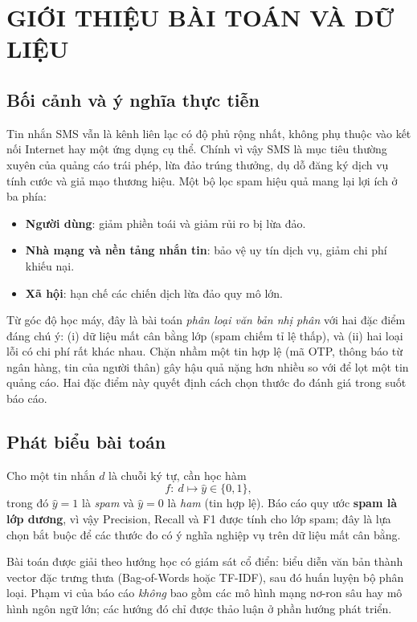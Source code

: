 \chapter{GIỚI THIỆU BÀI TOÁN VÀ DỮ LIỆU}

\section{Bối cảnh và ý nghĩa thực tiễn}

Tin nhắn SMS vẫn là kênh liên lạc có độ phủ rộng nhất, không phụ thuộc vào kết nối Internet hay một ứng dụng cụ thể. Chính vì vậy SMS là mục tiêu thường xuyên của quảng cáo trái phép, lừa đảo trúng thưởng, dụ dỗ đăng ký dịch vụ tính cước và giả mạo thương hiệu. Một bộ lọc spam hiệu quả mang lại lợi ích ở ba phía:

\begin{itemize}
    \item \textbf{Người dùng}: giảm phiền toái và giảm rủi ro bị lừa đảo.
    \item \textbf{Nhà mạng và nền tảng nhắn tin}: bảo vệ uy tín dịch vụ, giảm chi phí khiếu nại.
    \item \textbf{Xã hội}: hạn chế các chiến dịch lừa đảo quy mô lớn.
\end{itemize}

Từ góc độ học máy, đây là bài toán \textit{phân loại văn bản nhị phân} với hai đặc điểm đáng chú ý: (i) dữ liệu mất cân bằng lớp (spam chiếm tỉ lệ thấp), và (ii) hai loại lỗi có chi phí rất khác nhau. Chặn nhầm một tin hợp lệ (mã OTP, thông báo từ ngân hàng, tin của người thân) gây hậu quả nặng hơn nhiều so với để lọt một tin quảng cáo. Hai đặc điểm này quyết định cách chọn thước đo đánh giá trong suốt báo cáo.

\section{Phát biểu bài toán}

Cho một tin nhắn $d$ là chuỗi ký tự, cần học hàm
\[
f:\ d \mapsto \hat{y}\in\{0,1\},
\]
trong đó $\hat{y}=1$ là \textit{spam} và $\hat{y}=0$ là \textit{ham} (tin hợp lệ). Báo cáo quy ước \textbf{spam là lớp dương}, vì vậy Precision, Recall và F1 được tính cho lớp spam; đây là lựa chọn bắt buộc để các thước đo có ý nghĩa nghiệp vụ trên dữ liệu mất cân bằng.

Bài toán được giải theo hướng học có giám sát cổ điển: biểu diễn văn bản thành vector đặc trưng thưa (Bag-of-Words hoặc TF-IDF), sau đó huấn luyện bộ phân loại. Phạm vi của báo cáo \textit{không} bao gồm các mô hình mạng nơ-ron sâu hay mô hình ngôn ngữ lớn; các hướng đó chỉ được thảo luận ở phần hướng phát triển.

